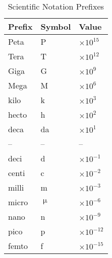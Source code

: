 \documentclass[main.tex]{subfiles}
\begin{document}
                    \begin{table}[!h]
                        \caption{Scientific Notation Prefixes}
                        \label{table: Scientific Notation Prefixes}
                        \vspace{-2em}
                        \begin{center}
                            \begin{tabular}{||C{5em}|C{5em}|C{5em}||}
                                \hline
                                \textbf{Prefix} & \textbf{Symbol} & \textbf{Value}\\
                                \hline\hline
                                Peta & P & $\times 10^{15}$\\
                                \hline
                                Tera & T & $\times 10^{12}$\\
                                \hline
                                Giga & G & $\times 10^{9}$\\
                                \hline
                                Mega & M & $\times 10^{6}$\\
                                \hline
                                kilo & k & $\times 10^{3}$\\
                                \hline
                                hecto & h & $\times 10^{2}$\\
                                \hline
                                deca & da & $\times 10^{1}$\\
                                \hline
                                -- & -- & --\\
                                \hline
                                deci & d & $\times 10^{-1}$\\
                                \hline
                                centi & c & $\times 10^{-2}$\\
                                \hline
                                milli & m & $\times 10^{-3}$\\
                                \hline
                                micro & $\upmu$ & $\times 10^{-6}$\\
                                \hline
                                nano & n & $\times 10^{-9}$\\
                                \hline
                                pico & p & $\times 10^{-12}$\\
                                \hline
                                femto & f & $\times 10^{-15}$\\
                                \hline
                            \end{tabular}
                        \end{center}
                    \end{table}
                
\end{document}
